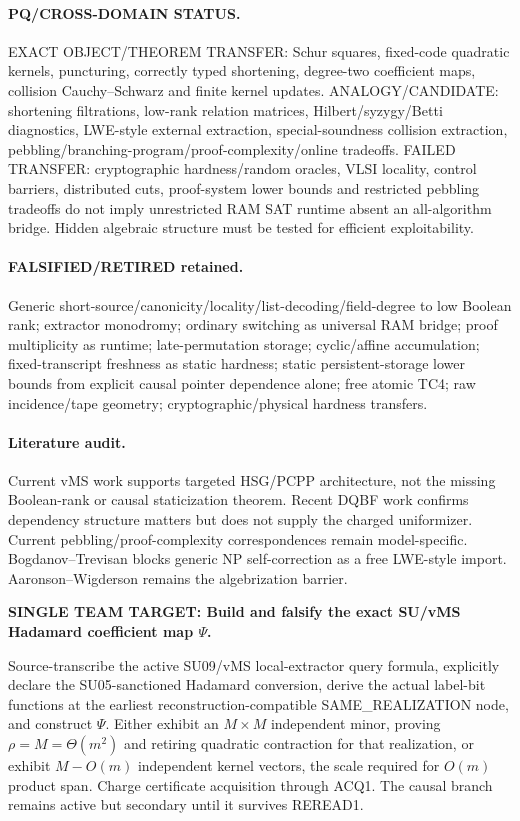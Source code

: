 \documentclass[11pt]{article}
\begin{document}
\paragraph{PQ/CROSS-DOMAIN STATUS.} EXACT OBJECT/THEOREM TRANSFER: Schur squares, fixed-code quadratic kernels, puncturing, correctly typed shortening, degree-two coefficient maps, collision Cauchy--Schwarz and finite kernel updates. ANALOGY/CANDIDATE: shortening filtrations, low-rank relation matrices, Hilbert/syzygy/Betti diagnostics, LWE-style external extraction, special-soundness collision extraction, pebbling/branching-program/proof-complexity/online tradeoffs. FAILED TRANSFER: cryptographic hardness/random oracles, VLSI locality, control barriers, distributed cuts, proof-system lower bounds and restricted pebbling tradeoffs do not imply unrestricted RAM SAT runtime absent an all-algorithm bridge. Hidden algebraic structure must be tested for efficient exploitability.

\paragraph{FALSIFIED/RETIRED retained.} Generic short-source/canonicity/locality/list-decoding/field-degree to low Boolean rank; extractor monodromy; ordinary switching as universal RAM bridge; proof multiplicity as runtime; late-permutation storage; cyclic/affine accumulation; fixed-transcript freshness as static hardness; static persistent-storage lower bounds from explicit causal pointer dependence alone; free atomic TC4; raw incidence/tape geometry; cryptographic/physical hardness transfers.

\paragraph{Literature audit.} Current vMS work supports targeted HSG/PCPP architecture, not the missing Boolean-rank or causal staticization theorem. Recent DQBF work confirms dependency structure matters but does not supply the charged uniformizer. Current pebbling/proof-complexity correspondences remain model-specific. Bogdanov--Trevisan blocks generic NP self-correction as a free LWE-style import. Aaronson--Wigderson remains the algebrization barrier.

\begin{candidatebox}
\textbf{SINGLE TEAM TARGET: Build and falsify the exact SU/vMS Hadamard coefficient map \(\Psi\).}

Source-transcribe the active SU09/vMS local-extractor query formula, explicitly declare the SU05-sanctioned Hadamard conversion, derive the actual label-bit functions at the earliest reconstruction-compatible SAME_REALIZATION node, and construct \(\Psi\). Either exhibit an \(M\times M\) independent minor, proving \(\rho=M=\Theta(m^2)\) and retiring quadratic contraction for that realization, or exhibit \(M-O(m)\) independent kernel vectors, the scale required for \(O(m)\) product span. Charge certificate acquisition through ACQ1. The causal branch remains active but secondary until it survives REREAD1.
\end{candidatebox}
\end{document}
